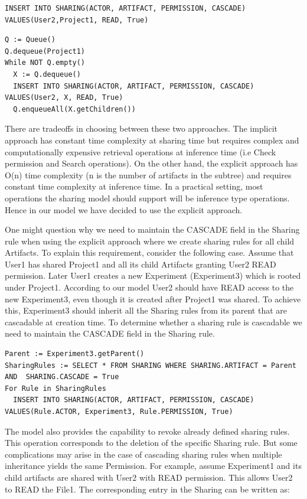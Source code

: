\documentclass[sigconf]{acmart}
\begin{document}
\begin{lstlisting} 
INSERT INTO SHARING(ACTOR, ARTIFACT, PERMISSION, CASCADE) VALUES(User2,Project1, READ, True)
\end{lstlisting}

\begin{lstlisting} 
Q := Queue()
Q.dequeue(Project1)
While NOT Q.empty()
  X := Q.dequeue()
  INSERT INTO SHARING(ACTOR, ARTIFACT, PERMISSION, CASCADE) VALUES(User2, X, READ, True)
  Q.enqueueAll(X.getChildren())
\end{lstlisting}

There are tradeoffs in choosing between these two approaches. The implicit approach has constant time complexity at sharing time but requires complex and computationally expensive retrieval operations at inference time (i.e Check permission and Search operations). On the other hand, the explicit approach has O(n) time complexity (n is the number of artifacts in the subtree) and requires constant time complexity at inference time. In a practical setting, most operations the sharing model should support will be inference type operations. Hence in our model we have decided to use the explicit approach.

One might question why we need to maintain the CASCADE field in the Sharing rule when using the explicit approach where we create sharing rules for all child Artifacts. To explain this requirement, consider the following case. Assume that User1 has shared Project1 and all its child Artifacts granting  User2 READ permission. Later User1 creates a new Experiment (Experiment3) which is rooted under Project1. According to our model User2 should have READ access to the new Experiment3, even though it is created after Project1 was shared. To achieve this, Experiment3 should inherit all the Sharing rules from its parent that  are cascadable at creation time. To determine whether a sharing rule is cascadable we need to maintain the CASCADE field in the Sharing rule.

\begin{lstlisting}
Parent := Experiment3.getParent()
SharingRules := SELECT * FROM SHARING WHERE SHARING.ARTIFACT = Parent AND  SHARING.CASCADE = True
For Rule in SharingRules
  INSERT INTO SHARING(ACTOR, ARTIFACT, PERMISSION, CASCADE) VALUES(Rule.ACTOR, Experiment3, Rule.PERMISSION, True)
\end{lstlisting}

The model also provides the capability to revoke already defined sharing rules. This operation corresponds to the deletion of the specific Sharing rule. But some complications may arise in the case of cascading sharing rules when multiple inheritance yields the same Permission. For example, assume Experiment1 and its child artifacts are shared with User2 with READ permission. This allows User2 to READ the File1. The corresponding entry in the Sharing can be written as:
\end{document}
